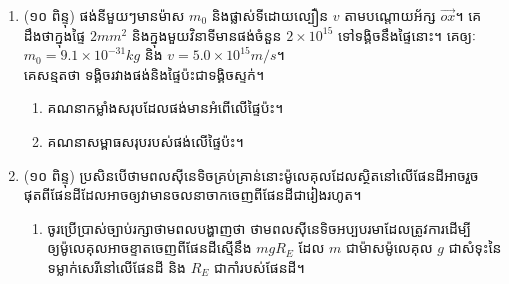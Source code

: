 \documentclass{classes/exam}
\begin{document}
\begin{enumerate}[I]
\begin{figure}[H]
		\end{figure}
		\item {\color{magenta}\ks (១០ ពិន្ទុ)} ផង់នីមួយៗមានម៉ាស $m_{0}$ និងផ្លាស់ទីដោយល្បឿន $v$ តាមបណ្តោយអ័ក្ស $\overrightarrow{ox}$។ គេដឹងថាក្នុងផ្ទៃ $2mm^{2}$ និងក្នុងមួយវិនាទីមានផង់ចំនួន $2\times10^{15}$ ទៅទង្គិចនឹងផ្ទៃនោះ។ គេឲ្យៈ $m_{0}=9.1\times10^{-31}kg$ និង $v=5.0\times10^{15}m/s$។\\
		គេសន្មតថា ទង្គិចរវាងផង់និងផ្ទៃប៉ះជាទង្គិចស្ទក់។
		\begin{enumerate}[k,2]
			\item គណនាកម្លាំងសរុបដែលផង់មានអំពើលើផ្ទៃប៉ះ។
			\item គណនាសម្ពាធសរុបរបស់ផង់លើផ្ទៃប៉ះ។
		\end{enumerate}
		\item {\color{magenta}\ks (១០ ពិន្ទុ)} ប្រសិនបើថាមពលសុីនេទិចគ្រប់គ្រាន់នោះម៉ូលេគុលដែលស្ថិតនៅលើផែនដីអាចរួចផុតពីផែនដីដែលអាចឲ្យវាមានចលនាចាកចេញពីផែនដីជារៀងរហូត។
		\begin{enumerate}[k]
			\item ចូរប្រើប្រាស់ច្បាប់រក្សាថាមពលបង្ហាញថា ថាមពលសុីនេទិចអប្បបរមាដែលត្រូវការដើម្បីឲ្យម៉ូលេគុលអាចខ្ទាតចេញពីផែនដីស្មើនឹង $mgR_{E}$ ដែល $m$ ជាម៉ាសម៉ូលេគុល $g$ ជាសំទុះនៃទម្លាក់សេរីនៅលើផែនដី និង $R_{E}$ ជាកាំរបស់ផែនដី។

\end{enumerate}
\end{enumerate}
\end{document}
